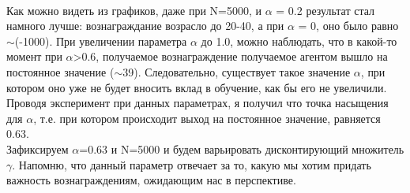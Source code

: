 \documentclass[a4paper]{report}
\theoremstyle{definition}
\theoremstyle{plain}
\theoremstyle{remark}
\theoremstyle{remark}
\theoremstyle{definition}
\begin{document}
\\
Как можно видеть из графиков, даже при N=5000, и $\alpha$ = 0.2 результат стал намного лучше: вознаграждание возрасло до 20-40, а при $\alpha$ = 0, оно было равно $\sim$(-1000). При увеличении параметра $\alpha$ до 1.0, можно наблюдать, что в какой-то момент при $\alpha$>0.6, получаемое вознаграждение получаемое агентом вышло на постоянное значение ($\sim$39). Следовательно, существует такое значение $\alpha$, при котором оно уже не будет вносить вклад в обучение, как бы его не увеличили. Проводя эксперимент при данных параметрах, я получил что точка насыщения для $\alpha$, т.е. при котором происходит выход на постоянное значение, равняется 0.63.
\\
Зафиксируем $\alpha$=0.63 и N=5000 и будем варьировать дисконтирующий множитель $\gamma$. Напомню, что данный параметр отвечает за то, какую мы хотим придать важность вознаграждениям, ожидающим нас в перспективе.
\end{document}
